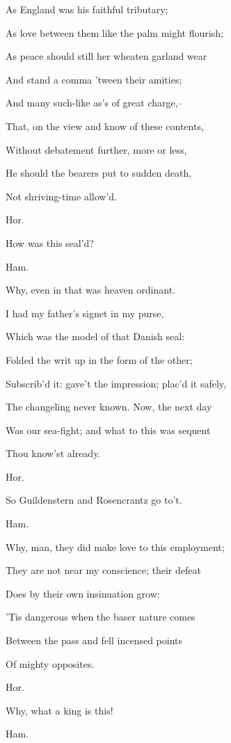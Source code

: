 \documentclass[12pt]{book}
\begin{document}
As England was his faithful tributary;

As love between them like the palm might flourish;

As peace should still her wheaten garland wear

And stand a comma 'tween their amities;

And many such-like as's of great charge,--

That, on the view and know of these contents,

Without debatement further, more or less,

He should the bearers put to sudden death,

Not shriving-time allow'd.



Hor.

How was this seal'd?



Ham.

Why, even in that was heaven ordinant.

I had my father's signet in my purse,

Which was the model of that Danish seal:

Folded the writ up in the form of the other;

Subscrib'd it: gave't the impression; plac'd it safely,

The changeling never known. Now, the next day

Was our sea-fight; and what to this was sequent

Thou know'st already.



Hor.

So Guildenstern and Rosencrantz go to't.



Ham.

Why, man, they did make love to this employment;

They are not near my conscience; their defeat

Does by their own insinuation grow:

'Tis dangerous when the baser nature comes

Between the pass and fell incensed points

Of mighty opposites.



Hor.

Why, what a king is this!



Ham.
\end{document}

